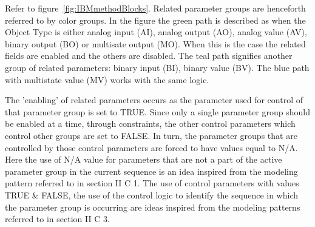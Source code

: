 \documentclass[conference]{IEEEtran}
\newcommand{\todo}[1]{}
\renewcommand{\todo}[1]{{\color{red} TODO: {#1}}}
\begin{document}

		Refer to figure~\ref{fig:IBMmethodBlocks}. 
	Related parameter groups are henceforth referred to by color groups.
	In the figure the green path is described as when the Object Type is either analog input (AI), analog output (AO),
	analog value (AV), binary output (BO) or multisate output (MO). 
	When this is the case the related fields are enabled and the others are disabled.
  The teal path signifies another group of related parameters: binary input (BI), binary value (BV). 
	The blue path with multistate value (MV) works with the same logic.
	
		The 'enabling' of related parameters occurs as the parameter used for control of that parameter group is set to TRUE.
	Since only a single parameter group should be enabled at a time,
	through constraints, the other control parameters which control other groups are set to FALSE. 
	In turn, the parameter groups that are controlled by those control parameters are forced to have values equal to N/A.
	Here the use of N/A value for parameters that are not a part of the active parameter group in the current sequence 
	is an idea inspired from the modeling pattern referred to in section II C 1.
	The use of control parameters with values TRUE \& FALSE, 
	the use of the control logic to identify the sequence in which the parameter group is occurring 
	are ideas inspired from the modeling patterns referred to in section II C 3.
	
\end{document}
